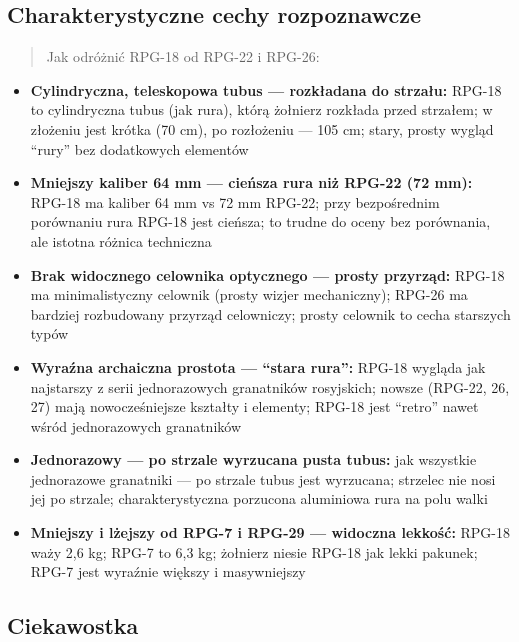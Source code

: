 \documentclass[12pt,oneside]{book}
\providecommand{\tightlist}{%
  \setlength{\itemsep}{0pt}\setlength{\parskip}{0pt}}
\begin{document}
\subsection{Charakterystyczne cechy
rozpoznawcze}\label{charakterystyczne-cechy-rozpoznawcze-84}

\begin{quote}
Jak odróżnić RPG-18 od RPG-22 i RPG-26:
\end{quote}

\begin{itemize}
\tightlist
\item
  \textbf{Cylindryczna, teleskopowa tubus --- rozkładana do strzału:}
  RPG-18 to cylindryczna tubus (jak rura), którą żołnierz rozkłada przed
  strzałem; w złożeniu jest krótka (70 cm), po rozłożeniu --- 105 cm;
  stary, prosty wygląd ``rury'' bez dodatkowych elementów
\item
  \textbf{Mniejszy kaliber 64 mm --- cieńsza rura niż RPG-22 (72 mm):}
  RPG-18 ma kaliber 64 mm vs 72 mm RPG-22; przy bezpośrednim porównaniu
  rura RPG-18 jest cieńsza; to trudne do oceny bez porównania, ale
  istotna różnica techniczna
\item
  \textbf{Brak widocznego celownika optycznego --- prosty przyrząd:}
  RPG-18 ma minimalistyczny celownik (prosty wizjer mechaniczny); RPG-26
  ma bardziej rozbudowany przyrząd celowniczy; prosty celownik to cecha
  starszych typów
\item
  \textbf{Wyraźna archaiczna prostota --- ``stara rura'':} RPG-18
  wygląda jak najstarszy z serii jednorazowych granatników rosyjskich;
  nowsze (RPG-22, 26, 27) mają nowocześniejsze kształty i elementy;
  RPG-18 jest ``retro'' nawet wśród jednorazowych granatników
\item
  \textbf{Jednorazowy --- po strzale wyrzucana pusta tubus:} jak
  wszystkie jednorazowe granatniki --- po strzale tubus jest wyrzucana;
  strzelec nie nosi jej po strzale; charakterystyczna porzucona
  aluminiowa rura na polu walki
\item
  \textbf{Mniejszy i lżejszy od RPG-7 i RPG-29 --- widoczna lekkość:}
  RPG-18 waży 2,6 kg; RPG-7 to 6,3 kg; żołnierz niesie RPG-18 jak lekki
  pakunek; RPG-7 jest wyraźnie większy i masywniejszy
\end{itemize}

\subsection{Ciekawostka}\label{ciekawostka-84}
\end{document}
